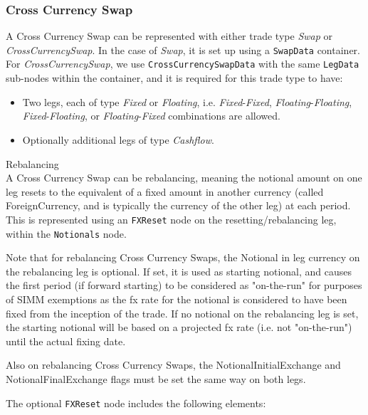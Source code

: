 \subsubsection{Cross Currency Swap}
\label{ss:cross_currency_swap}

A Cross Currency Swap can be represented with either trade type \emph{Swap} or \emph{CrossCurrencySwap}. In the case of \emph{Swap}, it is set up using a {\tt SwapData} container. For \emph{CrossCurrencySwap}, we use {\tt CrossCurrencySwapData} with the same {\tt LegData} sub-nodes within the container, and it is required for this trade type to have: 
\begin{itemize}
 \item Two legs, each of type \emph{Fixed} or \emph{Floating}, i.e. \emph{Fixed}-\emph{Fixed}, \emph{Floating}-\emph{Floating}, \emph{Fixed}-\emph{Floating}, or \emph{Floating}-\emph{Fixed} combinations are allowed. 
\item  Optionally additional legs of type \emph{Cashflow}.
\end{itemize}

Rebalancing\\
A Cross Currency Swap can be rebalancing, meaning the notional amount on one leg resets to the equivalent of a fixed amount in another currency (called ForeignCurrency, and is typically the currency of the other leg) at each period. This is represented using an \lstinline!FXReset! node on the resetting/rebalancing leg, within the \lstinline!Notionals! node. 

Note that for rebalancing Cross Currency Swaps, the Notional in leg currency on the rebalancing leg is optional. If set, it is used as starting notional, and causes the first period (if forward starting)  to be considered as "on-the-run" for purposes of SIMM exemptions as the fx rate for the notional is considered to have been fixed from the inception of the trade. If no notional on the rebalancing leg is set, the starting notional will be based on a projected fx rate (i.e. not "on-the-run") until the actual fixing date.

Also on rebalancing Cross Currency Swaps, the NotionalInitialExchange and NotionalFinalExchange flags must be set the same way on both legs.

The optional \lstinline!FXReset! node includes the following elements:

